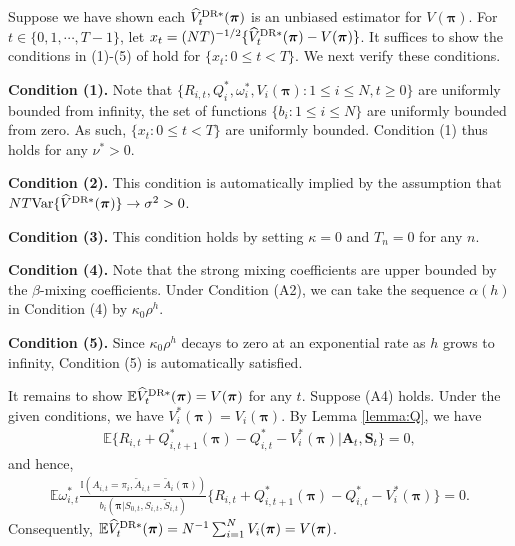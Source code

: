 \documentclass{article}
\newcommand{\Mean}{{\mathbb{E}}}
\newcommand{\Var}{{\mbox{Var}}}
\begin{document}
Suppose we have shown each $\widehat{V}_t^{\hbox{\scriptsize{DR}}*}(\bm{\pi})$ is an unbiased estimator for $V(\bm{\pi})$. For $t\in \{0,1,\cdots,T-1\}$, let $x_t=(NT)^{-1/2} \{\widehat{V}_t^{\hbox{\scriptsize{DR}}*}(\bm{\pi})-V(\bm{\pi})\}$. It suffices to show the conditions in (1)-(5) of \cite{francq2005central} hold for $\{x_t:0\le t<T\}$. We next verify these conditions.

\textbf{Condition (1).} Note that $\{R_{i,t}, Q_i^*, \omega_{i}^*, V_i(\bm{\pi}):1\le i\le N,t\ge 0\}$ are uniformly bounded from infinity, the set of functions $\{b_i:1\le i\le N\}$ are uniformly bounded from zero. As such, $\{x_t:0\le t<T\}$ are uniformly bounded. Condition (1) thus holds for any $\nu^*>0$. 

\textbf{Condition (2).} This condition is automatically implied by the assumption that $ NT \Var\{\widehat{V}^{\hbox{\scriptsize{DR}}*}(\bm{\pi})\}\to \sigma^2>0$. 

\textbf{Condition (3).} This condition holds by setting $\kappa=0$ and $T_n=0$ for any $n$.

\textbf{Condition (4).} Note that the strong mixing coefficients are upper bounded by the $\beta$-mixing coefficients. Under Condition (A2), we can take the sequence $\alpha(h)$ in Condition (4) by $\kappa_0 \rho^h$. 

\textbf{Condition (5).} Since $\kappa_0 \rho^h$ decays to zero at an exponential rate as $h$ grows to infinity, Condition (5) is automatically satisfied. 

It remains to show $\Mean \widehat{V}_t^{\hbox{\scriptsize{DR}}*}(\bm{\pi})=V(\bm{\pi})$ for any $t$. Suppose (A4) holds. Under the given conditions, we have $V_i^*(\bm{\pi})=V_i(\bm{\pi})$. By Lemma \ref{lemma:Q}, we have
\begin{eqnarray*}
	\Mean \{R_{i,t}+Q_{i,t+1}^*(\bm{\pi})-Q_{i,t}^*-V_i^*(\bm{\pi})|\bm{A}_t,\bm{S}_t\}=0,
\end{eqnarray*}
and hence,
\begin{eqnarray*}
	\Mean \omega_{i,t}^*\frac{\mathbb{I}(A_{i,t}=\pi_i,\widetilde{A}_{i,t}=\widetilde{A}_i(\bm{\pi}))}{b_i(\bm{\pi}|S_{0,t},S_{i,t},\widetilde{S}_{i,t})}
	\{R_{i,t}+Q_{i,t+1}^*(\bm{\pi})-Q_{i,t}^*-V_i^*(\bm{\pi})\}=0.
\end{eqnarray*}
Consequently, $\Mean \widehat{V}_t^{\hbox{\scriptsize{DR}}*}(\bm{\pi})=N^{-1} \sum_{i=1}^N V_i(\bm{\pi})=V(\bm{\pi})$.
\end{document}
